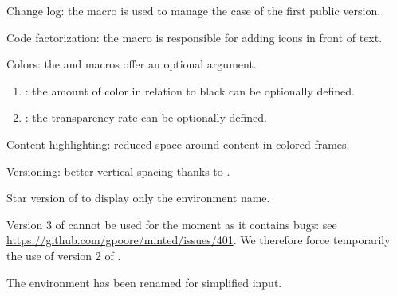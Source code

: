 \begin{tdocnew}
    \item Change log: the  macro is used to manage the case of the first public version.

    \item Code factorization: the  macro is responsible for adding icons in front of text.
\end{tdocnew}


\begin{tdocupdate}
    \item Colors: the  and  macros offer an optional argument.
    \begin{enumerate}
        \item {}: the amount of color in relation to black can be optionally defined.

        \item {}: the transparency rate can be optionally defined.
    \end{enumerate}

    \item Content highlighting: reduced space around content in colored frames.

    \item Versioning: better vertical spacing thanks to .
\end{tdocupdate}

\tdocsep




\begin{tdocnew}[version = 1.3.1, date = 2024-09-26]
    \item Star version of  to display only the environment name.
\end{tdocnew}

\tdocsep




\begin{tdoctech}[version = 1.3.0, date = 2024-09-25]
    \item Version 3 of  cannot be used for the moment as it contains bugs: see \url{https://github.com/gpoore/minted/issues/401}. We therefore force temporarily the use of version 2 of .
\end{tdoctech}


\begin{tdocbreak}
    \item The  environment has been renamed  for simplified input.
\end{tdocbreak}


